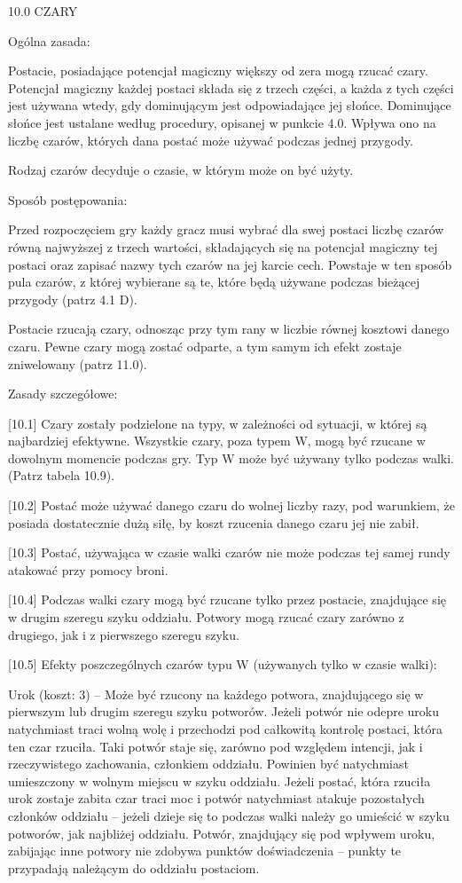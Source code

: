 10.0 CZARY

Ogólna zasada:

Postacie, posiadające potencjał magiczny większy od zera mogą rzucać czary.
Potencjał magiczny każdej postaci składa się z trzech części, a każda z tych części jest używana wtedy, gdy dominującym jest odpowiadające jej słońce.
Dominujące słońce jest ustalane według procedury, opisanej w punkcie 4.0.
Wpływa ono na liczbę czarów, których dana postać może używać podczas jednej przygody.

Rodzaj czarów decyduje o czasie, w którym może on być użyty.

Sposób postępowania:

Przed rozpoczęciem gry każdy gracz musi wybrać dla swej postaci liczbę czarów równą najwyższej z trzech wartości, składających się na potencjał magiczny tej postaci oraz zapisać nazwy tych czarów na jej karcie cech.
Powstaje w ten sposób pula czarów, z której wybierane są te, które będą używane podczas bieżącej przygody (patrz 4.1 D).

Postacie rzucają czary, odnosząc przy tym rany w liczbie równej kosztowi danego czaru.
Pewne czary mogą zostać odparte, a tym samym ich efekt zostaje zniwelowany (patrz 11.0).

Zasady szczegółowe:

[10.1] Czary zostały podzielone na typy, w zależności od sytuacji, w której są najbardziej efektywne.
Wszystkie czary, poza typem W, mogą być rzucane w dowolnym momencie podczas gry.
Typ W może być używany tylko podczas walki.
(Patrz tabela 10.9).

[10.2] Postać może używać danego czaru do wolnej liczby razy, pod warunkiem, że posiada dostatecznie dużą siłę, by koszt rzucenia danego czaru jej nie zabił.

[10.3] Postać, używająca w czasie walki czarów nie może podczas tej samej rundy atakować przy pomocy broni.

[10.4] Podczas walki czary mogą być rzucane tylko przez postacie, znajdujące się w drugim szeregu szyku oddziału.
Potwory mogą rzucać czary zarówno z drugiego, jak i z pierwszego szeregu szyku.

[10.5] Efekty poszczególnych czarów typu W (używanych tylko w czasie walki):

Urok (koszt: 3) – Może być rzucony na każdego potwora, znajdującego się w pierwszym lub drugim szeregu szyku potworów.
Jeżeli potwór nie odepre uroku natychmiast traci wolną wolę i przechodzi pod całkowitą kontrolę postaci, która ten czar rzuciła.
Taki potwór staje się, zarówno pod względem intencji, jak i rzeczywistego zachowania, członkiem oddziału.
Powinien być natychmiast umieszczony w wolnym miejscu w szyku oddziału.
Jeżeli postać, która rzuciła urok zostaje zabita czar traci moc i potwór natychmiast atakuje pozostałych członków oddziału – jeżeli dzieje się to podczas walki należy go umieścić w szyku potworów, jak najbliżej oddziału.
Potwór, znajdujący się pod wpływem uroku, zabijając inne potwory nie zdobywa punktów doświadczenia – punkty te przypadają należącym do oddziału postaciom.


